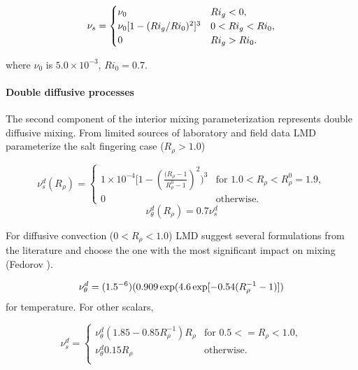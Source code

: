 \begin{equation}
\nu_s=\begin{cases}
\nu_0&   \text{$ Ri_g<0$}, \\
\nu_0[1-(Ri_g/Ri_0)^2]^3&  \text{$0< Ri_g<Ri_0$},  \\
0&   \text{$Ri_g>Ri_0$}.  
\end{cases}
\end{equation}

where $\nu_0$ is $5.0 \times 10^{-3}$, $Ri_0 = 0.7$.  

\paragraph{Double diffusive processes}
The second component of the interior mixing parameterization represents
double diffusive mixing.  From limited sources of laboratory and field
data LMD parameterize the salt fingering case ($R_{\rho}>1.0$)

\begin{equation}
\nu_{s}^{d}(R_{\rho})=
	\begin{cases}
1\times10^{-4}[1-(\frac{(R_{\rho}-1}{R_{\rho}^0-1})^2)^{3}&   \text{for $1.0<R_{\rho}<R_{\rho}^0=1.9$},\\
           0& \text{otherwise}.
        \end{cases}
\end{equation}
\begin{equation}
\nu_{\theta}^{d}(R_{\rho})=0.7\nu_{s}^{d}
\end{equation}

For diffusive convection ($0<R_{\rho}<1.0$) LMD suggest several
formulations from the literature and choose the one with the most
significant impact on mixing (Fedorov \cite{Fedorov88}).

\begin{equation}
\nu_{\theta}^{d}=(1.5 \time 10^{-6})(0.909 \exp(4.6 \exp[-0.54(R_{\rho}^{-1}-1)])
\end{equation}
for temperature.  For other scalars,

\begin{equation}
   \nu_{s}^{d}=
	\begin{cases}
	     \nu_{\theta}^{d}(1.85-0.85R_{\rho}^{-1})R_{\rho}& \text{for $0.5<=R_{\rho}<1.0$},\\ 
             \nu_{\theta}^{d}0.15R_{\rho}&  \text{otherwise}. \\
        \end{cases}
\end{equation}

